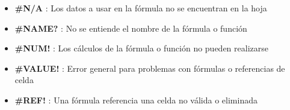 \begin{description}
{\begin{description}
{\begin{itemize}
            \item {\textbf{\#N/A} : Los datos a usar en la fórmula no se encuentran en la hoja}
            \item {\textbf{\#NAME?} : No se entiende el nombre de la fórmula o función}
            \item {\textbf{\#NUM!} : Los cálculos de la fórmula o función no pueden realizarse}
            \item {\textbf{\#VALUE!} : Error general para problemas con fórmulas o referencias de celda}
            \item {\textbf{\#REF!} : Una fórmula referencia una celda no válida o eliminada}
        \end{itemize}} 
    \end{description}}
\end{description}

\newpage



